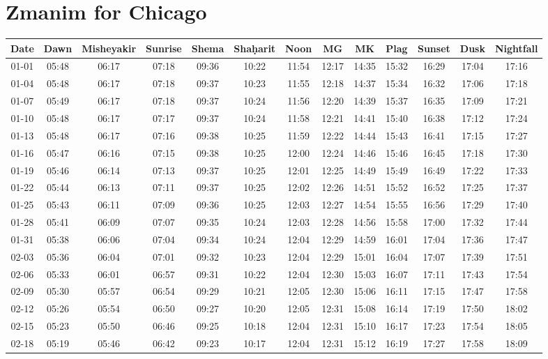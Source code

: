 \chapter{Zmanim for Chicago }

\begin{footnotesize}
	\begin{longtable}{c | c | c | c | c | c | c | c | c | c | c | c | c}
		Date&Dawn&Misheyakir&Sunrise&Shema&Sha\d{h}arit&Noon&MG&MK&Plag&Sunset&Dusk&Nightfall\\\hline\endhead
		01-01&05:48&06:17&07:18&09:36&10:22&11:54&12:17&14:35&15:32&16:29&17:04&17:16\\\hline
		01-04&05:48&06:17&07:18&09:37&10:23&11:55&12:18&14:37&15:34&16:32&17:06&17:18\\\hline
		01-07&05:49&06:17&07:18&09:37&10:24&11:56&12:20&14:39&15:37&16:35&17:09&17:21\\\hline
		01-10&05:48&06:17&07:17&09:37&10:24&11:58&12:21&14:41&15:40&16:38&17:12&17:24\\\hline
		01-13&05:48&06:17&07:16&09:38&10:25&11:59&12:22&14:44&15:43&16:41&17:15&17:27\\\hline
		01-16&05:47&06:16&07:15&09:38&10:25&12:00&12:24&14:46&15:46&16:45&17:18&17:30\\\hline
		01-19&05:46&06:14&07:13&09:37&10:25&12:01&12:25&14:49&15:49&16:49&17:22&17:33\\\hline
		01-22&05:44&06:13&07:11&09:37&10:25&12:02&12:26&14:51&15:52&16:52&17:25&17:37\\\hline
		01-25&05:43&06:11&07:09&09:36&10:25&12:03&12:27&14:54&15:55&16:56&17:29&17:40\\\hline
		01-28&05:41&06:09&07:07&09:35&10:24&12:03&12:28&14:56&15:58&17:00&17:32&17:44\\\hline
		01-31&05:38&06:06&07:04&09:34&10:24&12:04&12:29&14:59&16:01&17:04&17:36&17:47\\\hline
		02-03&05:36&06:04&07:01&09:32&10:23&12:04&12:29&15:01&16:04&17:07&17:39&17:51\\\hline
		02-06&05:33&06:01&06:57&09:31&10:22&12:04&12:30&15:03&16:07&17:11&17:43&17:54\\\hline
		02-09&05:30&05:57&06:54&09:29&10:21&12:05&12:30&15:06&16:11&17:15&17:47&17:58\\\hline
		02-12&05:26&05:54&06:50&09:27&10:20&12:05&12:31&15:08&16:14&17:19&17:50&18:02\\\hline
		02-15&05:23&05:50&06:46&09:25&10:18&12:04&12:31&15:10&16:17&17:23&17:54&18:05\\\hline
		02-18&05:19&05:46&06:42&09:23&10:17&12:04&12:31&15:12&16:19&17:27&17:58&18:09\\\hline

\end{longtable}
\end{footnotesize}
